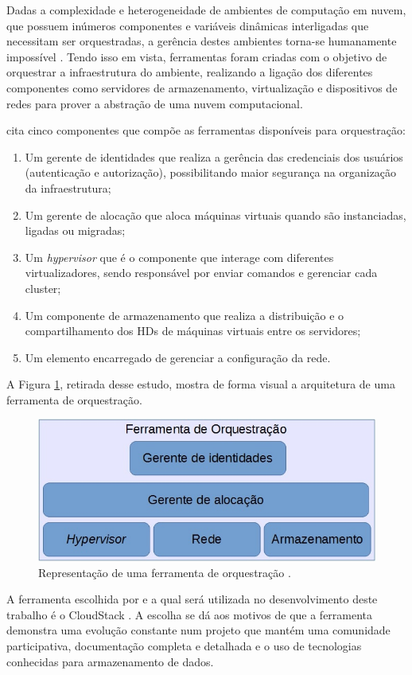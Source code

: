 Dadas a complexidade e heterogeneidade de ambientes de computação em nuvem, que possuem inúmeros componentes e variáveis dinâmicas interligadas que necessitam ser orquestradas, a gerência destes ambientes torna-se humanamente impossível \cite{forecasting}. Tendo isso em vista, ferramentas foram criadas com o objetivo de orquestrar a infraestrutura do ambiente, realizando a ligação dos diferentes componentes como servidores de armazenamento, virtualização e dispositivos de redes para prover a abstração de uma nuvem computacional.

 cita cinco componentes que compõe as ferramentas disponíveis para orquestração:
\begin{enumerate} 
 \item Um gerente de identidades que realiza a gerência das credenciais dos usuários (autenticação e autorização), possibilitando maior segurança na organização da infraestrutura;
 \item Um gerente de alocação que aloca máquinas virtuais quando são instanciadas, ligadas ou migradas;
 \item Um \emph{hypervisor} que é o componente que interage com diferentes virtualizadores, sendo responsável por enviar comandos e gerenciar cada cluster;
 \item Um componente de armazenamento que realiza a distribuição e o compartilhamento dos HDs de máquinas virtuais entre os servidores;
 \item Um elemento encarregado de gerenciar a configuração da rede.
\end{enumerate}

A Figura \ref{fig:orquestracao}, retirada desse estudo, mostra de forma visual a arquitetura de uma ferramenta de orquestração.

 \begin{figure}[!htb]
 	\centering
 	\caption{Representação de uma ferramenta de orquestração \cite{tcc-gabriel}.}\label{fig:orquestracao}
 	\includegraphics[width=1\textwidth]{figuras/ferramentasOrquestracao.jpg}
 \end{figure}
 
A ferramenta escolhida por  e a qual será utilizada no desenvolvimento deste trabalho é o CloudStack \cite{cloudstack}. A escolha se dá aos motivos de que a ferramenta demonstra uma evolução constante num projeto que mantém uma comunidade participativa, documentação completa e detalhada e o uso de tecnologias conhecidas para armazenamento de dados.
